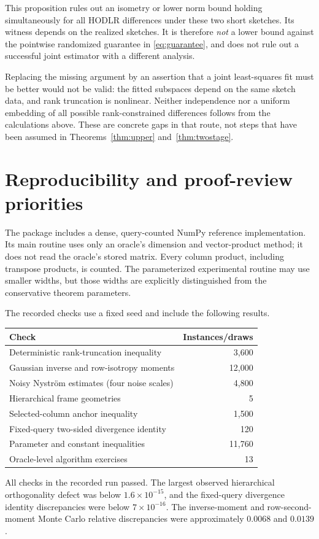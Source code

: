 \documentclass[11pt]{article}
\theoremstyle{remark}
\begin{document}
This proposition rules out an isometry or lower norm bound holding
simultaneously for all HODLR differences under these two short sketches.
Its witness depends on the realized sketches. It is therefore \emph{not} a
lower bound against the pointwise randomized guarantee in \eqref{eq:guarantee},
and does not rule out a successful joint estimator with a different analysis.

Replacing the missing argument by an assertion that a joint least-squares
fit must be better would not be valid: the fitted subspaces depend on the
same sketch data, and rank truncation is nonlinear. Neither independence nor
a uniform embedding of all possible rank-constrained differences follows
from the calculations above. These are concrete gaps in that route, not
steps that have been assumed in Theorems~\ref{thm:upper} and~\ref{thm:twostage}.

\section{Reproducibility and proof-review priorities}\label{sec:checks}

The package includes a dense, query-counted NumPy reference implementation.
Its main routine uses only an oracle's dimension and vector-product method;
it does not read the oracle's stored matrix. Every column product, including
transpose products, is counted. The parameterized experimental routine may
use smaller widths, but those widths are explicitly distinguished from the
conservative theorem parameters.

The recorded checks use a fixed seed and include the following results.
\begin{center}\small
\begin{tabular}{@{}p{.56\linewidth}r@{}}
\toprule
Check & Instances/draws\\
\midrule
Deterministic rank-truncation inequality & 3,600\\
Gaussian inverse and row-isotropy moments & 12,000\\
Noisy Nystr\"om estimates (four noise scales) & 4,800\\
Hierarchical frame geometries & 5\\
Selected-column anchor inequality & 1,500\\
Fixed-query two-sided divergence identity & 120\\
Parameter and constant inequalities & 11,760\\
Oracle-level algorithm exercises & 13\\
\bottomrule
\end{tabular}
\end{center}
All checks in the recorded run passed. The largest observed hierarchical
orthogonality defect was below $1.6\times10^{-15}$, and the fixed-query
divergence identity discrepancies were below $7\times10^{-16}$.
The inverse-moment and row-second-moment Monte Carlo relative discrepancies
were approximately $0.0068$ and $0.0139$.
\end{document}
